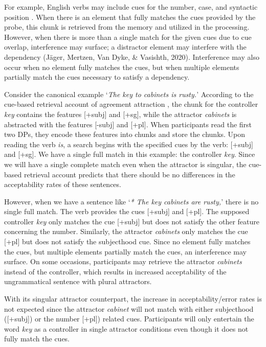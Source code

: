For example, English verbs may include cues for the number, case, and syntactic position \citep{ArnettWagers:2017}. When there is an element that fully matches the cues provided by the probe, this chunk is retrieved from the memory and utilized in the processing. However, when there is more than a single match for the given cues due to cue overlap, interference may surface; a distractor element may interfere with the dependency (J\"ager, Mertzen, Van Dyke, \& Vasishth, 2020). Interference may also occur when no element fully matches the cues, but when multiple elements partially match the cues necessary to satisfy a dependency. 

Consider the canonical example `\emph{The key to cabinets is rusty.}' According to the cue-based retrieval account of agreement attraction \citep{WagersEtAl:2009}, the chunk for the controller \emph{key} contains the features [+{subj}] and [+{sg}], while the attractor \emph{cabinets} is abstracted with the features [-{subj}] and [+{pl}]. When participants read the first two DPs, they encode these features into chunks and store the chunks. Upon reading the verb \emph{is}, a search begins with the specified cues by the verb: [+{subj}] and [+{sg}]. We have a single full match in this example: the controller \emph{key}. Since we will have a single complete match even when the attractor is singular, the cue-based retrieval account predicts that there should be no differences in the acceptability rates of these sentences.

However, when we have a sentence like `\emph{* The key cabinets are rusty,}' there is no single full match. The verb provides the cues [+{subj}] and [+{pl}]. The supposed controller \emph{key} only matches the cue [+{subj}] but does not satisfy the other feature concerning the number. Similarly, the attractor \emph{cabinets} only matches the cue [+{pl}] but does not satisfy the subjecthood cue. Since no element fully matches the cues, but multiple elements partially match the cues, an interference may surface. On some occasions, participants may retrieve the attractor \emph{cabinets} instead of the controller, which results in increased acceptability of the ungrammatical sentence with plural attractors. 

With its singular attractor counterpart, the increase in acceptability/error rates is not expected since the attractor \emph{cabinet} will not match with either subjecthood ([+{subj}]) or  the number [+{pl}]) related cues. Participants will only entertain the word \emph{key} as a controller in single attractor conditions even though it does not fully match the cues.

